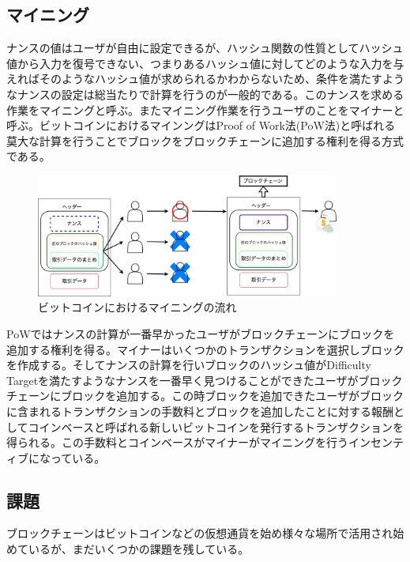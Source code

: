 \documentclass[12pt]{jarticle}
\begin{document}
\subsection{マイニング}
ナンスの値はユーザが自由に設定できるが、ハッシュ関数の性質としてハッシュ値から入力を復号できない、つまりあるハッシュ値に対してどのような入力を与えればそのようなハッシュ値が求められるかわからないため、条件を満たすようなナンスの設定は総当たりで計算を行うのが一般的である。このナンスを求める作業をマイニングと呼ぶ。またマイニング作業を行うユーザのことをマイナーと呼ぶ。ビットコインにおけるマインングはProof of Work法(PoW法)と呼ばれる莫大な計算を行うことでブロックをブロックチェーンに追加する権利を得る方式である。

\begin{figure}[h]
 \centering
   \includegraphics[width=100mm]{figures/PoW.jpg}
 \caption{ビットコインにおけるマイニングの流れ}
 \label{pow}
\end{figure}

PoWではナンスの計算が一番早かったユーザがブロックチェーンにブロックを追加する権利を得る。マイナーはいくつかのトランザクションを選択しブロックを作成する。そしてナンスの計算を行いブロックのハッシュ値がDifficulty Targetを満たすようなナンスを一番早く見つけることができたユーザがブロックチェーンにブロックを追加する。この時ブロックを追加できたユーザがブロックに含まれるトランザクションの手数料とブロックを追加したことに対する報酬としてコインベースと呼ばれる新しいビットコインを発行するトランザクションを得られる。この手数料とコインベースがマイナーがマイニングを行うインセンティブになっている。

\subsection{課題}
ブロックチェーンはビットコインなどの仮想通貨を始め様々な場所で活用され始めているが、まだいくつかの課題を残している。
\end{document}
